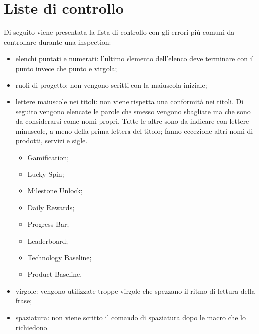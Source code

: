 \section {Liste di controllo}
Di seguito viene presentata la lista di controllo con gli errori più comuni da controllare
durante una inspection\glo:

\begin{itemize}
		\item elenchi puntati e numerati: l'ultimo elemento dell'elenco deve terminare con il punto invece che punto e virgola;
		\item ruoli di progetto: non vengono scritti con la maiuscola iniziale;
		\item lettere maiuscole nei titoli: non viene rispetta una conformità nei titoli. Di seguito vengono elencate le parole che smesso vengono sbagliate ma che sono da considerarsi come nomi propri. Tutte le altre sono da indicare con lettere minuscole, a meno della prima lettera del titolo; fanno eccezione altri nomi di prodotti, servizi e sigle.
		\begin{itemize}
			\item Gamification;
			\item Lucky Spin;
			\item Milestone Unlock;
			\item Daily Rewards;
			\item Progress Bar;
			\item Leaderboard;
			\item Technology Baseline;
			\item Product Baseline.
		\end{itemize}
		\item virgole: vengono utilizzate troppe virgole che spezzano il ritmo di lettura della
frase;
		\item spaziatura: non viene scritto il comando di spaziatura dopo le macro che lo
richiedono.
	
\end{itemize}